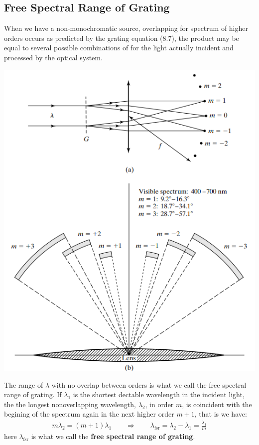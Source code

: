 \documentclass[11pt]{book}
\theoremstyle{break}
\theoremstyle{break}
\begin{document}
\subsection{Free Spectral Range of Grating}
When we have a non-monochromatic source, overlapping for spectrum of higher orders occurs as predicted by the grating equation (8.7), the product may be equal to several possible combinations of for the light actually incident and processed by the optical system. 
\begin{center}
\includegraphics[scale=1]{overlap}
\end{center}


The range of $\lambda$ with no overlap between orders is what we call the free spectral range of grating. If $\lambda_1$ is the shortest dectable wavelength in the incident light, the the longest nonoverlapping wavelength, $\lambda_2$, in order $m$, is coincident with the begining of the spectrum again in the next higher order $m+1$, that is we have:
\begin{align*}
m\lambda_2 = (m+1)\lambda_1 \qquad \Rightarrow \qquad \lambda_{\text{fsr}} = \lambda_2 - \lambda_1 = \frac{\lambda_1}{m}
\end{align*}
here $\lambda_{\text{fsr}}$ is what we call the \textbf{free spectral range of grating}.\\
\end{document}
